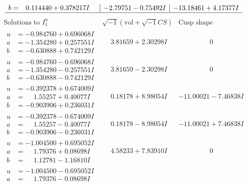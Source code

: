 \documentclass[1p]{elsarticle_modified}
\theoremstyle{definition}
\newcommand{\I}{\sqrt{-1}}
\begin{document}
$$\begin{array}{c|c|c}
\begin{aligned}
b &= \phantom{-}0.114440 + 0.378217 I\end{aligned}
 & -2.79751 - 0.75492 I & -13.18461 + 4.17377 I\\
 \hline 
 \end{array}$$\newpage$$\begin{array}{c|c|c}  
\text{Solutions to }I^u_{1}& \I (\text{vol} + \sqrt{-1}CS) & \text{Cusp shape}\\
 \hline 
\begin{aligned}
u &= -0.984760 + 0.696068 I \\
a &= -1.354280 + 0.257551 I \\
b &= -0.630888 + 0.742129 I\end{aligned}
 & \phantom{-}3.81659 + 2.30298 I & \phantom{-0.000000 } 0 \\ \hline\begin{aligned}
u &= -0.984760 - 0.696068 I \\
a &= -1.354280 - 0.257551 I \\
b &= -0.630888 - 0.742129 I\end{aligned}
 & \phantom{-}3.81659 - 2.30298 I & \phantom{-0.000000 } 0 \\ \hline\begin{aligned}
u &= -0.392378 + 0.674009 I \\
a &= \phantom{-}1.55257 + 0.40077 I \\
b &= -0.903906 + 0.236031 I\end{aligned}
 & \phantom{-}0.18178 + 8.98054 I & -11.00021 - 7.46838 I \\ \hline\begin{aligned}
u &= -0.392378 - 0.674009 I \\
a &= \phantom{-}1.55257 - 0.40077 I \\
b &= -0.903906 - 0.236031 I\end{aligned}
 & \phantom{-}0.18178 - 8.98054 I & -11.00021 + 7.46838 I \\ \hline\begin{aligned}
u &= -1.004500 + 0.695052 I \\
a &= \phantom{-}1.79376 + 0.08698 I \\
b &= \phantom{-}1.12781 - 1.16810 I\end{aligned}
 & \phantom{-}4.58233 + 7.83910 I & \phantom{-0.000000 } 0 \\ \hline\begin{aligned}
u &= -1.004500 - 0.695052 I \\
a &= \phantom{-}1.79376 - 0.08698 I \\

\end{aligned}
\end{array}$$
\end{document}

